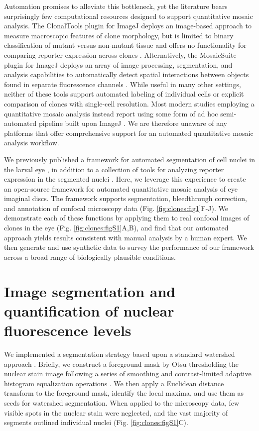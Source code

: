 Automation promises to alleviate this bottleneck, yet the literature bears surprisingly few computational resources designed to support quantitative mosaic analysis. The ClonalTools plugin for ImageJ deploys an image-based approach to measure macroscopic features of clone morphology, but is limited to binary classification of mutant versus non-mutant tissue and offers no functionality for comparing reporter expression across clones \cite{Mort2009}. Alternatively, the MosaicSuite plugin for ImageJ deploys an array of image processing, segmentation, and analysis capabilities to automatically detect spatial interactions between objects found in separate fluorescence channels \cite{Helmuth2010,Shivanandan2013}. While useful in many other settings, neither of these tools support automated labeling of individual cells or explicit comparison of clones with single-cell resolution. Most modern studies employing a quantitative mosaic analysis instead report using some form of ad hoc semi-automated pipeline built upon ImageJ \cite{Burrous2017,Ghiglione2018,Li2018}. We are therefore unaware of any platforms that offer comprehensive support for an automated quantitative mosaic analysis workflow.

We previously published a framework for automated segmentation of cell nuclei in the larval eye \cite{Pelaez2015a}, in addition to a collection of tools for analyzing reporter expression in the segmented nuclei \cite{Bernasek2018}. Here, we leverage this experience to create an open-source framework for automated quantitative mosaic analysis of eye imaginal discs. The framework supports segmentation, bleedthrough correction, and annotation of confocal microscopy data (Fig. \ref{fig:clones:fig1}F-J). We demonstrate each of these functions by applying them to real confocal images of clones in the eye (Fig. \ref{fig:clones:figS1}A,B), and find that our automated approach yields results consistent with manual analysis by a human expert. We then generate and use synthetic data to survey the performance of our framework across a broad range of biologically plausible conditions.

\section{Image segmentation and quantification of nuclear fluorescence levels}
\label{ch:clones:segmentation}

We implemented a segmentation strategy based upon a standard watershed approach \cite{VanderWalt2014}. Briefly, we construct a foreground mask by Otsu thresholding the nuclear stain image following a series of smoothing and contrast-limited adaptive histogram equalization operations \cite{NobuyukiOtsu1979,VanderWalt2014}. We then apply a Euclidean distance transform to the foreground mask, identify the local maxima, and use them as seeds for watershed segmentation. When applied to the microscopy data, few visible spots in the nuclear stain were neglected, and the vast majority of segments outlined individual nuclei (Fig. \ref{fig:clones:figS1}C).

